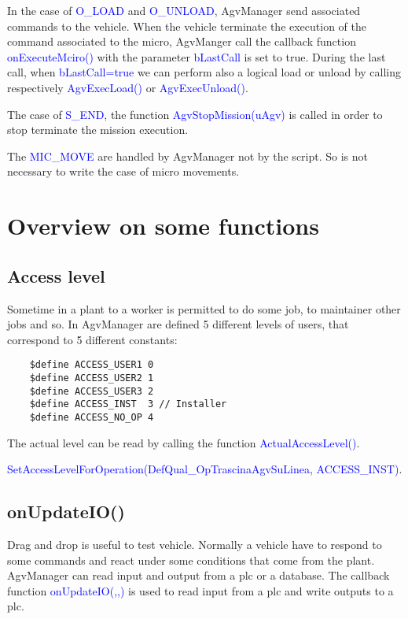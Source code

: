 In the case of \textcolor{blue}{O\_LOAD} and \textcolor{blue}{O\_UNLOAD}, AgvManager send associated commands to the vehicle. When the vehicle terminate the execution of the command associated to the micro, AgvManger call the callback function \textcolor{blue}{onExecuteMciro()} with the parameter \textcolor{blue}{bLastCall} is set to true. During the last call, when \textcolor{blue}{bLastCall=true} we can perform also a logical load or unload by calling respectively \textcolor{blue}{AgvExecLoad()} or \textcolor{blue}{AgvExecUnload()}.

The case of \textcolor{blue}{S\_END}, the function \textcolor{blue}{AgvStopMission(uAgv)} is called in order to stop terminate the mission execution.

The \textcolor{blue}{MIC\_MOVE} are handled by AgvManager not by the script. So is not necessary to write the case of micro movements.


%		
\section{Overview on some functions}
\subsection{Access level}
Sometime in a plant to a worker is permitted to do some job, to maintainer other jobs and so. In AgvManager are defined 5 different levels of users, that correspond to 5 different constants:

\begin{lstlisting}
	$define ACCESS_USER1 0
	$define ACCESS_USER2 1
	$define ACCESS_USER3 2
	$define ACCESS_INST  3 // Installer
	$define ACCESS_NO_OP 4
\end{lstlisting}

The actual level can be read by calling the function \textcolor{blue}{ActualAccessLevel()}.

\textcolor{blue}{SetAccessLevelForOperation(DefQual\_OpTrascinaAgvSuLinea, ACCESS\_INST)}.

\subsection{onUpdateIO()}
Drag and drop is useful to test vehicle. Normally a vehicle have to respond to some commands and react under some conditions that come from the plant. AgvManager can read input and output from a plc or a database. The callback function \textcolor{blue}{onUpdateIO(,,)} is used to read input from a plc and write outputs to a plc.

